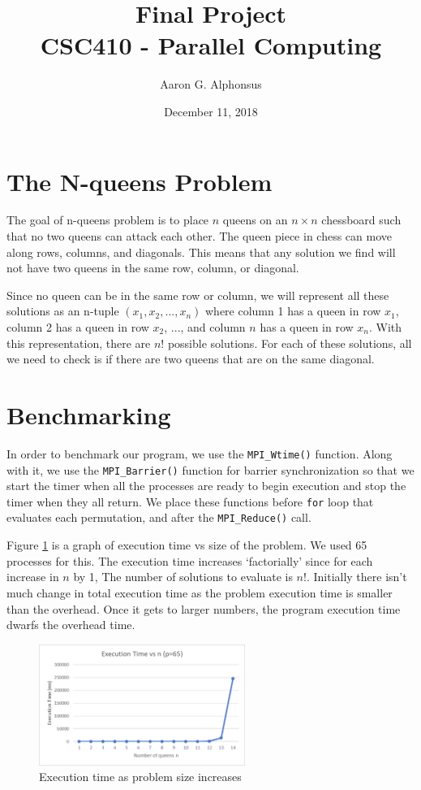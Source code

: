 \documentclass{article}
\title{Final Project\\ CSC410 - Parallel Computing}
\author{Aaron G. Alphonsus}
\date{December 11, 2018}
\begin{document}
\maketitle

\section{The N-queens Problem}

The goal of n-queens problem is to place $n$ queens on an $n \times n$ 
chessboard such that no two queens can attack each other. The queen piece in 
chess can move along rows, columns, and diagonals. This means that any solution 
we find will not have two queens in the same row, column, or diagonal.

\medskip
\noindent
Since no queen can be in the same row or column, we will represent all these 
solutions as an n-tuple $(x_1, x_2, ... , x_n)$ where column 1 has a queen in 
row $x_1$, column 2 has a queen in row $x_2$, $...$, and column $n$ has a queen 
in row $x_n$. With this representation, there are $n!$ possible solutions. For 
each of these solutions, all we need to check is if there are two queens that 
are on the same diagonal.

\section{Benchmarking}
In order to benchmark our program, we use the \texttt{MPI\_Wtime()} function. 
Along with it, we use the \texttt{MPI\_Barrier()} function for barrier 
synchronization so that we start the timer when all the 
processes are ready to begin execution and stop the timer when they all return. 
We place these functions before \texttt{for} loop that evaluates each 
permutation, and after the \texttt{MPI\_Reduce()} call. 

\medskip
\noindent
Figure \ref{fig:benchmark} is a graph of execution time vs size of the problem. 
We used 65 processes for this. The execution time increases `factorially' since 
for each increase in $n$ by 1, The number of solutions to evaluate is $n!$. 
Initially there isn't much change in total execution time as the problem 
execution time is smaller than the overhead. Once it gets to larger numbers, the
program execution time dwarfs the overhead time.

\begin{figure}[ht]
	\centering
    \includegraphics[width=0.6\textwidth]{benchmark.png} 
    \caption{Execution time as problem size increases}
    \label{fig:benchmark}
\end{figure}
\end{document}
